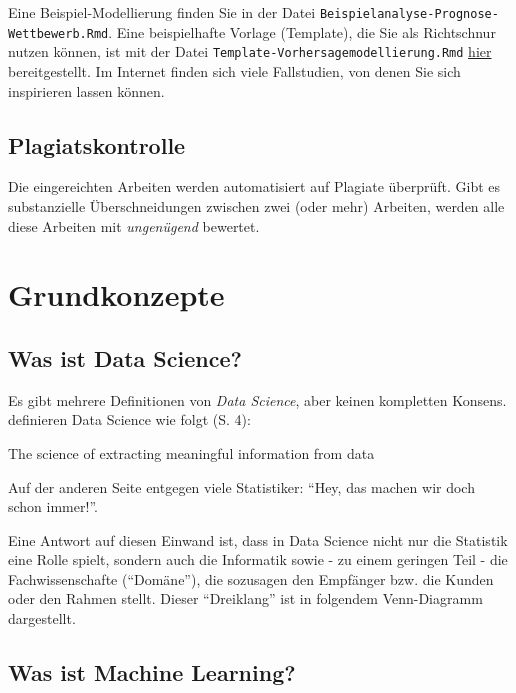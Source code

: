 \documentclass[
]{book}
\begin{document}
Eine Beispiel-Modellierung finden Sie in der Datei \texttt{Beispielanalyse-Prognose-Wettbewerb.Rmd}.
Eine beispielhafte Vorlage (Template), die Sie als Richtschnur nutzen können, ist mit der Datei \texttt{Template-Vorhersagemodellierung.Rmd} \href{https://github.com/sebastiansauer/vorhersagemodellierung/tree/main/Material}{hier} bereitgestellt.
Im Internet finden sich viele Fallstudien, von denen Sie sich inspirieren lassen können.

\hypertarget{plagiatskontrolle}{%
\section{Plagiatskontrolle}\label{plagiatskontrolle}}

Die eingereichten Arbeiten werden automatisiert auf Plagiate überprüft. Gibt es substanzielle Überschneidungen zwischen zwei (oder mehr) Arbeiten, werden alle diese Arbeiten mit \emph{ungenügend} bewertet.

\hypertarget{grundkonzepte-1}{%
\chapter{Grundkonzepte}\label{grundkonzepte-1}}

\hypertarget{was-ist-data-science}{%
\section{Was ist Data Science?}\label{was-ist-data-science}}

Es gibt mehrere Definitionen von \emph{Data Science}, aber keinen kompletten Konsens.
\citet{baumer_modern_2017} definieren Data Science wie folgt (S. 4):

The science of extracting meaningful information from data

Auf der anderen Seite entgegen viele Statistiker: ``Hey, das machen wir doch schon immer!''.

Eine Antwort auf diesen Einwand ist, dass in Data Science nicht nur die Statistik eine Rolle spielt, sondern auch die Informatik sowie - zu einem geringen Teil - die Fachwissenschafte (``Domäne''), die sozusagen den Empfänger bzw. die Kunden oder den Rahmen stellt.
Dieser ``Dreiklang'' ist in folgendem Venn-Diagramm dargestellt.

\hypertarget{was-ist-machine-learning}{%
\section{Was ist Machine Learning?}\label{was-ist-machine-learning}}
\end{document}
